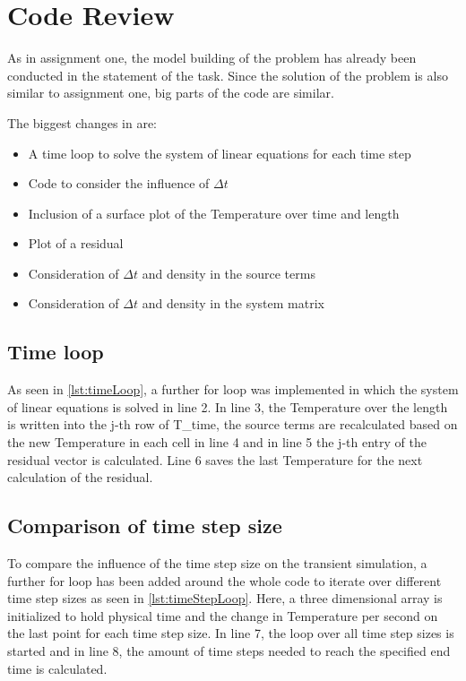 \chapter{Code Review}
As in assignment one, the model building of the problem has already been conducted in the statement of the task. Since the solution of the problem is also similar to assignment one, big parts of the code are similar.

The biggest changes in are:

\begin{itemize}
\item A time loop to solve the system of linear equations for each time step
\item Code to consider the influence of $\Delta t$
\item Inclusion of a surface plot of the Temperature over time and length
\item Plot of a residual
\item Consideration of $\Delta t$ and density in the source terms
\item Consideration of $\Delta t$ and density in the system matrix
\end{itemize}


\section{Time loop}


As seen in \autoref{lst:timeLoop}, a further for loop was implemented in which the system of linear equations is solved in line 2. In line 3, the Temperature over the length is written into the j-th row of T\_time, the source terms are recalculated based on the new Temperature in each cell in line 4 and in line 5 the j-th entry of the residual vector is calculated. Line 6 saves the last Temperature for the next calculation of the residual.

\section{Comparison of time step size}


To compare the influence of the time step size on the transient simulation, a further for loop has been added around the whole code to iterate over different time step sizes as seen in \autoref{lst:timeStepLoop}. Here, a three dimensional array is initialized to hold physical time and the change in Temperature per second on the last point for each time step size. In line 7, the loop over all time step sizes is started and in line 8, the amount of time steps needed to reach the specified end time is calculated.

